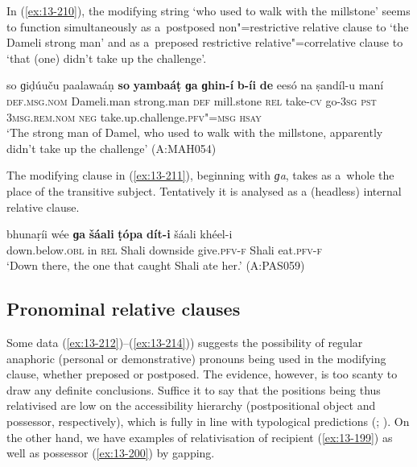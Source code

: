 In (\ref{ex:13-210}), the modifying string `who used to walk with the millstone' seems to function simultaneously as a~postposed non"=restrictive relative clause to `the Dameli strong man' and as a~preposed restrictive relative"=correlative clause to `that (one) didn't take up the challenge'.

\begin{exe}
\ex
\label{ex:13-210}
\gll so ɡiḍúuču paalawaáṇ \textbf{so} \textbf{yambaáṭ} \textbf{ɡa} \textbf{ɡhin-í} \textbf{b-íi} \textbf{de} eesó na ṣandíl-u maní\\
\textsc{def.msg.nom} Dameli.man strong.man \textsc{def} mill.stone \textsc{rel} take-\textsc{cv} go-\textsc{3sg} \textsc{pst} \textsc{3msg.rem.nom} \textsc{neg} take.up.challenge.\textsc{pfv"=msg} \textsc{hsay}\\
\glt `The strong man of Damel, who used to walk with the millstone, apparently didn't take up the challenge' (A:MAH054)
\end{exe}

The modifying clause in (\ref{ex:13-211}), beginning with \textit{ɡa}, takes as a~whole the place of the transitive subject. Tentatively it is analysed as a (headless) internal relative clause.

\begin{exe}
\ex
\label{ex:13-211}
\gll bhunaṛíi wée \textbf{ɡa} \textbf{šáali} \textbf{ṭópa} \textbf{dít-i}  šáali khéel-i \\
down.below.\textsc{obl} in \textsc{rel} Shali downside give.\textsc{pfv-f} Shali eat.\textsc{pfv-f} \\
\glt `Down there, the one that caught Shali ate her.' (A:PAS059)
\end{exe}

\subsection{Pronominal relative clauses}
\label{subsec:13-6-5}


Some data (\ref{ex:13-212})--(\ref{ex:13-214})) suggests the possibility of regular anaphoric (personal or demonstrative) pronouns being used in the modifying clause, whether preposed or postposed. The evidence, however, is too scanty to draw any definite conclusions. Suffice it to say that the positions being thus relativised are low on the accessibility hierarchy (postpositional object and possessor, respectively), which is fully in line with typological predictions (\citealt[147--148]{keenan1985}; \citealt[226]{andrews_relative2007}). On the other hand, we have examples of relativisation of recipient (\ref{ex:13-199}) as well as possessor (\ref{ex:13-200}) by gapping.

